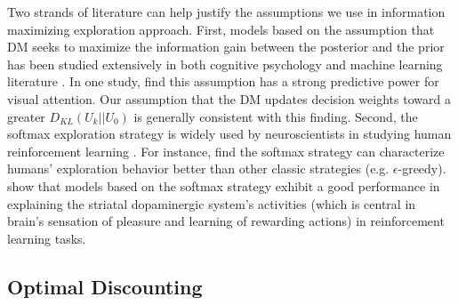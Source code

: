 \documentclass[
  12pt,
]{article}
\begin{document}
Two strands of literature can help justify the assumptions we use in
information maximizing exploration approach. First, models based on the
assumption that DM seeks to maximize the information gain between the
posterior and the prior has been studied extensively in both cognitive
psychology
\citep{oaksford1994rational, itti2009bayesian, friston2017active} and
machine learning literature \citep{settles2009active, ren2021survey}. In
one study, \citet{itti2009bayesian} find this assumption has a strong
predictive power for visual attention. Our assumption that the DM
updates decision weights toward a greater \(D_{KL}(U_k||U_0)\) is
generally consistent with this finding. Second, the softmax exploration
strategy is widely used by neuroscientists in studying human
reinforcement learning
\citep{daw2006cortical, fitzgerald2012action, collins2014opponent, niv2015reinforcement, leong2017dynamic}.
For instance, \citet{daw2006cortical} find the softmax strategy can
characterize humans' exploration behavior better than other classic
strategies (e.g. \(\epsilon\)-greedy). \citet{collins2014opponent} show
that models based on the softmax strategy exhibit a good performance in
explaining the striatal dopaminergic system's activities (which is
central in brain's sensation of pleasure and learning of rewarding
actions) in reinforcement learning tasks.

\hypertarget{optimal-discounting}{%
\subsection{\texorpdfstring{Optimal Discounting
\label{optimal_discount}}{Optimal Discounting }}\label{optimal-discounting}}
\end{document}
